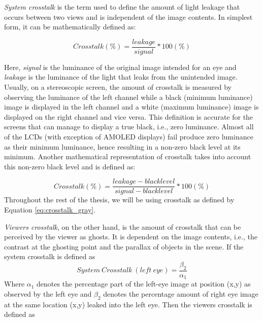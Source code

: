 \emph{System crosstalk} is the term used to define the amount of light leakage that occurs between two views and is independent of the image contents. In simplest form, it can be mathematically defined as:

\begin{equation}
Crosstalk(\%) = \frac{leakage}{signal} *100 (\%)
\label{eq:simple_crosstalk}
\end{equation}

Here, \emph{signal} is the luminance of the original image intended for an eye and \emph{leakage} is the luminance of the light that leaks from the unintended image. Usually, on a stereoscopic screen, the amount of crosstalk is measured by observing the luminance of the left channel while a black (minimum luminance) image is displayed in the left channel and a white (maximum luminance) image is displayed on the right channel and vice versa. This definition is accurate for the screens that can manage to display a true black, i.e., zero luminance. Almost all of the LCDs (with exception of AMOLED displays) fail produce zero luminance as their minimum luminance, hence resulting in a non-zero black level at its minimum. Another mathematical representation of crosstalk takes into account this non-zero black level and is defined as:

\begin{equation}
Crosstalk(\%) = \frac{leakage - black level}{signal - black level} *100 (\%)
\label{eq:crosstalk_gray}
\end{equation}
Throughout the rest of the thesis, we will be using crosstalk as defined by Equation \ref{eq:crosstalk_gray}.

\emph{Viewers crosstalk}, on the other hand, is the amount of crosstalk that can be perceived by the viewer as ghosts. It is dependent on the image contents, i.e., the contrast at the ghosting point and the parallax of objects in the scene. If the system crosstalk is defined as
\begin{equation}
System\ Crosstalk\ (left\ eye) = \frac{\beta_2}{\alpha_1}
\label{eq:system_ct}
\end{equation}
Where \(\alpha_1\) denotes the percentage part of the left-eye image at position (x,y) as observed by the left eye and \(\beta_2\) denotes the percentage amount of right eye image at the same location (x,y) leaked into the left eye. Then the viewers crosstalk is defined as

